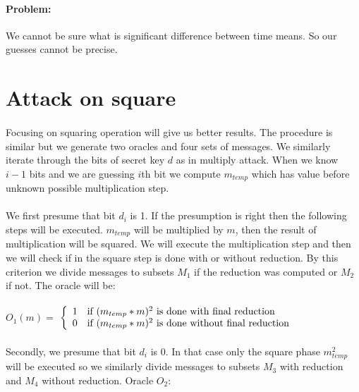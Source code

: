\documentclass[thesis=B,english]{FITthesis}[2012/10/20]
\begin{document}
{{\paragraph*{Problem:}{
We cannot be sure what is significant difference between time means. So our guesses cannot be precise.}\cite{mi-kry}

\section{Attack on square}
\paragraph*{}{
Focusing on squaring operation will give us better results. The procedure is similar but we generate two oracles and four sets of messages. We similarly iterate
through the bits of secret key \(d\) as in multiply attack. When we know \( i - 1 \) bits and we are guessing \(i\)th bit we compute \(m_{temp}\) 
which has value before unknown possible multiplication step.\cite{Dhem}
}
\paragraph*{}{
We first presume that bit \(d_i\) is 1. If the presumption is right then the following steps will be executed. \(m_{temp}\) will be multiplied by \(m\), 
then the result of multiplication will be squared. We will execute the multiplication step and then we will check if in the square step is done with or without reduction.
By this criterion we divide messages to subsets \(M_1\) if the reduction was computed or \(M_2\) if not. The oracle will be:
}\cite{Dhem}\cite{mi-kry}
\paragraph*{}
\( O_1(m) =\) $\left\{
  \begin{array}{cl}
    \text{1} & \text{\mbox{if}  \((m_{temp} * m)^2\) is done with final reduction} \\
    \text{0} & \text{\mbox{if}  \((m_{temp} * m)^2\) is done without final reduction} 
  \end{array}
\right.$
\paragraph*{}{
Secondly, we presume that bit \(d_i\) is 0. In that case only the square phase \(m_{temp}^2\) will be executed so we similarly divide messages to subsets \(M_3\) with reduction and 
\(M_4\) without reduction. Oracle \(O_2\):
}\cite{Dhem}\cite{mi-kry}


}}
\end{document}
